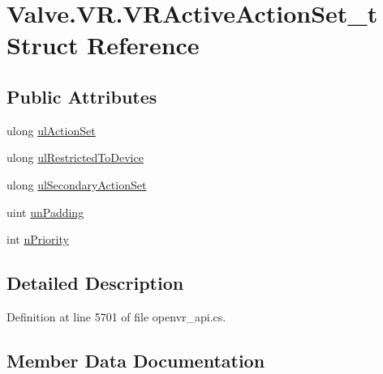 \hypertarget{struct_valve_1_1_v_r_1_1_v_r_active_action_set__t}{}\section{Valve.\+V\+R.\+V\+R\+Active\+Action\+Set\+\_\+t Struct Reference}
\label{struct_valve_1_1_v_r_1_1_v_r_active_action_set__t}
\subsection*{Public Attributes}
\begin{DoxyCompactItemize}
\item 
ulong \mbox{\hyperlink{struct_valve_1_1_v_r_1_1_v_r_active_action_set__t_a1aa917115d43c64cc4619677a4dc5969}{ul\+Action\+Set}}
\item 
ulong \mbox{\hyperlink{struct_valve_1_1_v_r_1_1_v_r_active_action_set__t_a1a1bb2f6d7b454033645f9658b7b0353}{ul\+Restricted\+To\+Device}}
\item 
ulong \mbox{\hyperlink{struct_valve_1_1_v_r_1_1_v_r_active_action_set__t_aa22681477b487b67dae39594e512ff01}{ul\+Secondary\+Action\+Set}}
\item 
uint \mbox{\hyperlink{struct_valve_1_1_v_r_1_1_v_r_active_action_set__t_ae8e073e93ec102a2277c338986882714}{un\+Padding}}
\item 
int \mbox{\hyperlink{struct_valve_1_1_v_r_1_1_v_r_active_action_set__t_a2c32b85c442efd57e408909bdb66c834}{n\+Priority}}
\end{DoxyCompactItemize}


\subsection{Detailed Description}


Definition at line 5701 of file openvr\+\_\+api.\+cs.



\subsection{Member Data Documentation}
\mbox{\label{struct_valve_1_1_v_r_1_1_v_r_active_action_set__t_a2c32b85c442efd57e408909bdb66c834}} 
